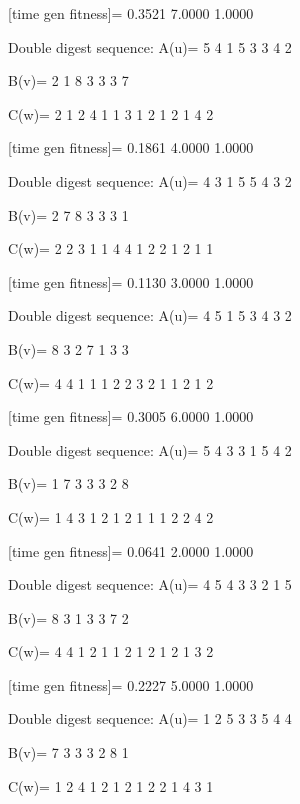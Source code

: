 [time gen fitness]=
    0.3521    7.0000    1.0000

Double digest sequence:
A(u)=
     5     4     1     5     3     3     4     2

B(v)=
     2     1     8     3     3     3     7

C(w)=
     2     1     2     4     1     1     3     1     2     1     2     1     4     2

[time gen fitness]=
    0.1861    4.0000    1.0000

Double digest sequence:
A(u)=
     4     3     1     5     5     4     3     2

B(v)=
     2     7     8     3     3     3     1

C(w)=
     2     2     3     1     1     4     4     1     2     2     1     2     1     1

[time gen fitness]=
    0.1130    3.0000    1.0000

Double digest sequence:
A(u)=
     4     5     1     5     3     4     3     2

B(v)=
     8     3     2     7     1     3     3

C(w)=
     4     4     1     1     1     2     2     3     2     1     1     2     1     2

[time gen fitness]=
    0.3005    6.0000    1.0000

Double digest sequence:
A(u)=
     5     4     3     3     1     5     4     2

B(v)=
     1     7     3     3     3     2     8

C(w)=
     1     4     3     1     2     1     2     1     1     1     2     2     4     2

[time gen fitness]=
    0.0641    2.0000    1.0000

Double digest sequence:
A(u)=
     4     5     4     3     3     2     1     5

B(v)=
     8     3     1     3     3     7     2

C(w)=
     4     4     1     2     1     1     2     1     2     1     2     1     3     2

[time gen fitness]=
    0.2227    5.0000    1.0000

Double digest sequence:
A(u)=
     1     2     5     3     3     5     4     4

B(v)=
     7     3     3     3     2     8     1

C(w)=
     1     2     4     1     2     1     2     1     2     2     1     4     3     1

